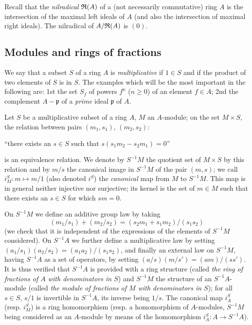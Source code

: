 \begin{env}[1.1.2]
\label{env-0.1.1.2}
Recall that the {\em nilradical} $\mathfrak{R}(A)$ of a (not necessarily
commutative) ring $A$ is the intersection of the maximal left ideals of $A$ (and
also the intersection of maximal right ideals). The nilradical of $A/\mathfrak{R}(A)$
is $(0)$.
\end{env}

\subsection{Modules and rings of fractions}
\label{subsection-modules-and-rings-of-fractions}

\begin{env}[1.2.1]
\label{env-0.1.2.1}
We say that a subset $S$ of a ring $A$ is {\em multiplicative} if $1\in S$ and
if the product of two elements of $S$ is in $S$. The examples which will be the
most important in the following are: 1st the set $S_f$ of
powers $f^n$ ($n\geqslant 0$) of an element $f\in A$; 2nd the
complement $A-\mathfrak{p}$ of a {\em prime} ideal $\mathfrak{p}$ of $A$.
\end{env}

\begin{env}[1.2.2]
\label{env-0.1.2.2}
Let $S$ be a multiplicative subset of a ring $A$, $M$ an $A$-module; on the set
$M\times S$, the relation between pairs $(m_1,s_1)$, $(m_2,s_2)$:
\begin{center}
   ``there exists an $s\in S$ such that $s(s_1 m_2-s_2 m_1)=0$''
\end{center}
is an equivalence relation. We denote by $S^{-1}M$ the quotient set of
$M\times S$ by this relation and by $m/s$ the canonical image in $S^{-1}M$ of
the pair $(m,s)$; we call $i_M^S:m\mapsto m/1$ (also denoted $i^S$) the
{\em canonical} map from $M$ to $S^{-1}M$. This map is in general neither
injective nor surjective; its kernel is the set of $m\in M$ such that there
exists an $s\in S$ for which $sm=0$.

On $S^{-1}M$ we define an additive group law by taking
\[
  (m_1/s_1)+(m_2/s_2)=(s_2 m_1+s_1 m_2)/(s_1 s_2)
\]
(we check that it is independent of the expressions of the elements of $S^{-1}M$
considered). On $S^{-1}A$ we further define a multiplicative law by setting
$(a_1/s_1)(a_2/s_2)=(a_1 a_2)/(s_1 s_2)$, and finally an external law on
$S^{-1}M$, having $S^{-1}A$ as a set of operators, by setting
$(a/s)(m/s')=(am)/(ss')$. It is thus verified that $S^{-1}A$ is provided with a
ring structure (called {\em the ring of fractions of $A$ with denominators in
$S$}) and $S^{-1}M$ the structure of an $S^{-1}A$-module (called {\em the
module of fractions of $M$ with denominators in $S$}); for all $s\in S$, $s/1$
is invertible in $S^{-1}A$, its inverse being $1/s$. The canonical map $i_A^S$
(resp. $i_M^S$) is a ring homomorphism (resp. a homomorphism of $A$-modules,
$S^{-1}M$ being considered as an $A$-module by means of the homomorphism
$i_A^S:A\to S^{-1}A$).
\end{env}

